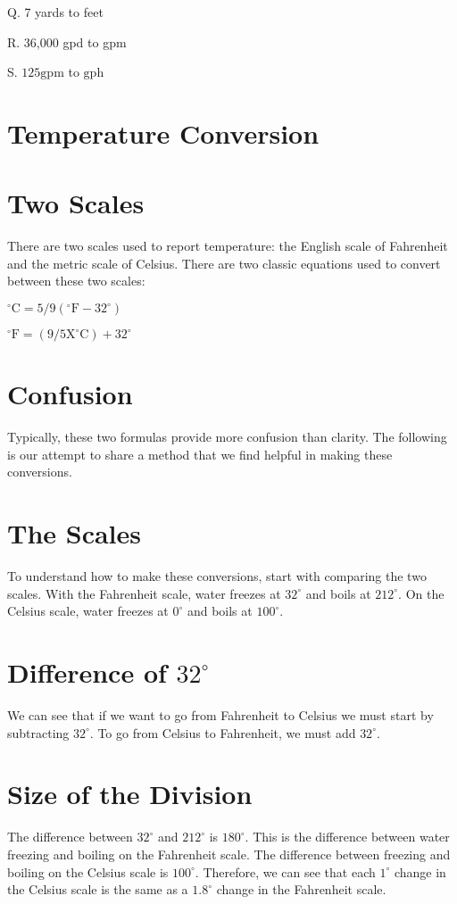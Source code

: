 Q. 7 yards to feet

R. 36,000 gpd to gpm

S. $125 \mathrm{gpm}$ to $\mathrm{gph}$

\section{Temperature Conversion}
\section{Two Scales}
There are two scales used to report temperature: the English scale of Fahrenheit and the metric scale of Celsius. There are two classic equations used to convert between these two scales:

${ }^{\circ} \mathrm{C}=5 / 9\left({ }^{\circ} \mathrm{F}-32^{\circ}\right)$

${ }^{\circ} \mathrm{F}=\left(9 / 5 \mathrm{X}^{\circ} \mathrm{C}\right)+32^{\circ}$

\section{Confusion}
Typically, these two formulas provide more confusion than clarity. The following is our attempt to share a method that we find helpful in making these conversions.

\section{The Scales}
To understand how to make these conversions, start with comparing the two scales. With the Fahrenheit scale, water freezes at $32^{\circ}$ and boils at $212^{\circ}$. On the Celsius scale, water freezes at $0^{\circ}$ and boils at $100^{\circ}$.

\section{Difference of $32^{\circ}$}
We can see that if we want to go from Fahrenheit to Celsius we must start by subtracting $32^{\circ}$. To go from Celsius to Fahrenheit, we must add $32^{\circ}$.

\section{Size of the Division}
The difference between $32^{\circ}$ and $212^{\circ}$ is $180^{\circ}$. This is the difference between water freezing and boiling on the Fahrenheit scale. The difference between freezing and boiling on the Celsius scale is $100^{\circ}$. Therefore, we can see that each $1^{\circ}$ change in the Celsius scale is the same as a $1.8^{\circ}$ change in the Fahrenheit scale.

